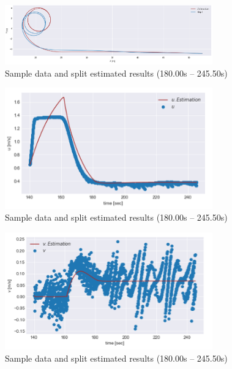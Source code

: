 \begin{figure}[htbp]
    \centering   
    \includegraphics[width=0.8\textwidth]{img/appendix2/5-4.png}
    \caption{Sample data and split estimated results (180.00s – 245.50s)}
    \label{fig:5-4_png}
\end{figure}

\begin{figure}[htbp]
    \centering   
    \includegraphics[width=0.8\textwidth]{img/appendix2/5-5.png}
    \caption{Sample data and split estimated results (180.00s – 245.50s)}
    \label{fig:5-5_png}
\end{figure}

\begin{figure}[htbp]
    \centering   
    \includegraphics[width=0.8\textwidth]{img/appendix2/5-6.png}
    \caption{Sample data and split estimated results (180.00s – 245.50s)}
    \label{fig:5-6_png}
\end{figure}

